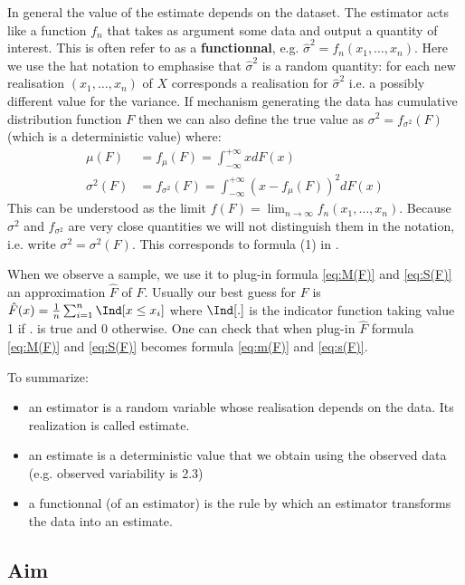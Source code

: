 \documentclass[12pt]{article}
\begin{document}
In general the value of the estimate depends on the dataset. The
estimator acts like a function \(f_n\) that takes as argument some
data and output a quantity of interest. This is often refer to as a
\textbf{functionnal}, e.g. \(\hat{\sigma}^2=f_n(x_1,\ldots,x_n)\). Here we
use the hat notation to emphasise that \(\hat{\sigma}^2\) is a random
quantity: for each new realisation \((x_1,\ldots,x_n)\) of \(X\)
corresponds a realisation for \(\hat{\sigma}^2\) i.e. a possibly
different value for the variance. If mechanism generating the data has
cumulative distribution function \(F\) then we can also define the
true value as \(\sigma^2=f_{\sigma^2}(F)\) (which is a deterministic
value) where:
\begin{align}
\mu(F) &= f_\mu(F) = \int_{-\infty}^{+\infty} x dF(x) \label{eq:M(F)}\\
\sigma^2(F) &= f_{\sigma^2}(F) = \int_{-\infty}^{+\infty} (x - f_\mu(F))^2 dF(x) \label{eq:S(F)}
\end{align}
This can be understood as the limit \(f(F)=\lim_{n \rightarrow \infty}
f_n(x_1,\ldots,x_n)\). Because \(\sigma^2\) and \(f_{\sigma^2}\) are
very close quantities we will not distinguish them in the notation,
i.e. write \(\sigma^2=\sigma^2(F)\). This corresponds to formula (1)
in \cite{lee1990u}. 

\bigskip

When we observe a sample, we use it to plug-in formula \eqref{eq:M(F)}
and \eqref{eq:S(F)} an approximation \(\hat{F}\) of \(F\). Usually our
best guess for \(F\) is \(\hat{F}(x)= \frac{1}{n}\sum_{i=1}^n
\Ind[x \leq x_i]\) where \(\Ind[.]\) is the indicator function taking value
1 if \(.\) is true and 0 otherwise. One can check that when plug-in
\(\hat{F}\) formula \eqref{eq:M(F)} and \eqref{eq:S(F)} becomes formula
\eqref{eq:m(F)} and \eqref{eq:s(F)}.

\bigskip

To summarize:
\begin{itemize}
\item an estimator is a random variable whose realisation depends on the
data. Its realization is called estimate.
\item an estimate is a deterministic value that we obtain using the
observed data (e.g. observed variability is 2.3)
\item a functionnal (of an estimator) is the rule by which an estimator
transforms the data into an estimate.
\end{itemize}

\subsection{Aim}
\label{sec:org98a6cd6}
\end{document}
